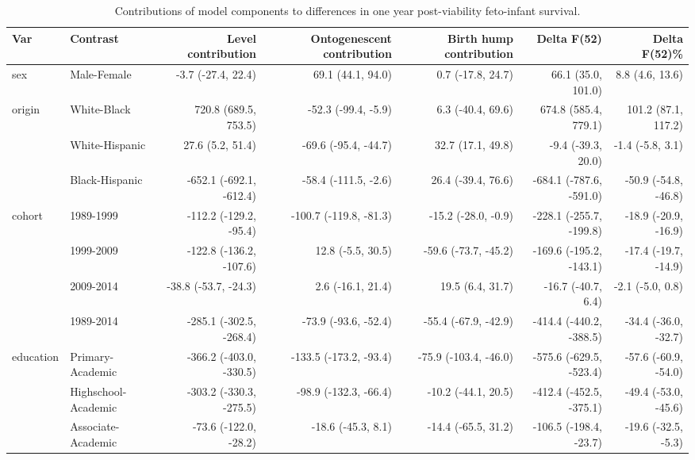 \begin{table}[t]
\caption*{
{\fontsize{20}{25}\selectfont  Contributions of model components to differences in one year post-viability feto-infant survival.\fontsize{12}{15}\selectfont }
} 
\fontsize{12.0pt}{14.0pt}\selectfont
\begin{tabular*}{\linewidth}{@{\extracolsep{\fill}}llrrrrr}
\toprule
Var & Contrast & Level contribution & Ontogenescent contribution & Birth hump contribution & Delta F(52) & Delta F(52)\% \\ 
\midrule\addlinespace[2.5pt]
sex & Male-Female & -3.7 (-27.4, 22.4) & 69.1 (44.1, 94.0) & 0.7 (-17.8, 24.7) & 66.1 (35.0, 101.0) & 8.8 (4.6, 13.6) \\ 
origin & White-Black & 720.8 (689.5, 753.5) & -52.3 (-99.4, -5.9) & 6.3 (-40.4, 69.6) & 674.8 (585.4, 779.1) & 101.2 (87.1, 117.2) \\ 
 & White-Hispanic & 27.6 (5.2, 51.4) & -69.6 (-95.4, -44.7) & 32.7 (17.1, 49.8) & -9.4 (-39.3, 20.0) & -1.4 (-5.8, 3.1) \\ 
 & Black-Hispanic & -652.1 (-692.1, -612.4) & -58.4 (-111.5, -2.6) & 26.4 (-39.4, 76.6) & -684.1 (-787.6, -591.0) & -50.9 (-54.8, -46.8) \\ 
cohort & 1989-1999 & -112.2 (-129.2, -95.4) & -100.7 (-119.8, -81.3) & -15.2 (-28.0, -0.9) & -228.1 (-255.7, -199.8) & -18.9 (-20.9, -16.9) \\ 
 & 1999-2009 & -122.8 (-136.2, -107.6) & 12.8 (-5.5, 30.5) & -59.6 (-73.7, -45.2) & -169.6 (-195.2, -143.1) & -17.4 (-19.7, -14.9) \\ 
 & 2009-2014 & -38.8 (-53.7, -24.3) & 2.6 (-16.1, 21.4) & 19.5 (6.4, 31.7) & -16.7 (-40.7, 6.4) & -2.1 (-5.0, 0.8) \\ 
 & 1989-2014 & -285.1 (-302.5, -268.4) & -73.9 (-93.6, -52.4) & -55.4 (-67.9, -42.9) & -414.4 (-440.2, -388.5) & -34.4 (-36.0, -32.7) \\ 
education & Primary-Academic & -366.2 (-403.0, -330.5) & -133.5 (-173.2, -93.4) & -75.9 (-103.4, -46.0) & -575.6 (-629.5, -523.4) & -57.6 (-60.9, -54.0) \\ 
 & Highschool-Academic & -303.2 (-330.3, -275.5) & -98.9 (-132.3, -66.4) & -10.2 (-44.1, 20.5) & -412.4 (-452.5, -375.1) & -49.4 (-53.0, -45.6) \\ 
 & Associate-Academic & -73.6 (-122.0, -28.2) & -18.6 (-45.3, 8.1) & -14.4 (-65.5, 31.2) & -106.5 (-198.4, -23.7) & -19.6 (-32.5, -5.3) \\ 
\bottomrule
\end{tabular*}
\end{table}

